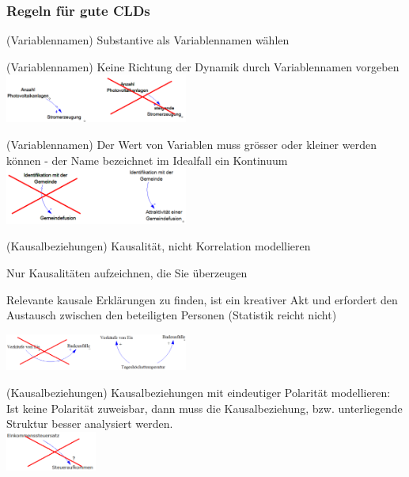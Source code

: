 \newpage

\subsubsection{Regeln für gute CLDs}
\begin{multicols}{2}
	\begin{compactenum}
		\item (Variablennamen) Substantive als Variablennamen wählen
		\item (Variablennamen) Keine Richtung der Dynamik durch Variablennamen vorgeben \\
		\includegraphics[width=0.45\textwidth]{pictures/regel_2}
		\item (Variablennamen) Der Wert von Variablen muss grösser oder kleiner werden können - der Name bezeichnet im Idealfall ein Kontinuum \\
		\includegraphics[width=0.45\textwidth]{pictures/regel_3}
		\item (Kausalbeziehungen) Kausalität, nicht Korrelation modellieren
		\begin{compactitem}
			\item Nur Kausalitäten aufzeichnen, die Sie überzeugen
			\item Relevante kausale Erklärungen zu finden, ist ein kreativer Akt und erfordert den Austausch zwischen den beteiligten Personen (Statistik	reicht nicht)
		\end{compactitem}
		\includegraphics[width=0.45\textwidth]{pictures/regel_4}
		\item (Kausalbeziehungen) Kausalbeziehungen mit eindeutiger Polarität modellieren: Ist keine Polarität zuweisbar, dann muss die	Kausalbeziehung, bzw. unterliegende Struktur besser	analysiert werden. \\
		\includegraphics[width=0.225\textwidth]{pictures/regel_5} 

\end{compactenum}
\end{multicols}
